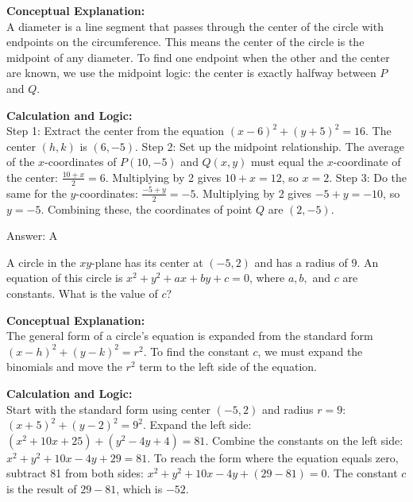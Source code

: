 \documentclass[11pt,paper=a4,answers]{exam}
\begin{document}
\begin{questions}
\begin{solution}
\textbf{Conceptual Explanation:} \\
A diameter is a line segment that passes through the center of the circle with endpoints on the circumference. This means the center of the circle is the midpoint of any diameter. To find one endpoint when the other and the center are known, we use the midpoint logic: the center is exactly halfway between $P$ and $Q$.

\vspace{30pt}

\textbf{Calculation and Logic:} \\
Step 1: Extract the center from the equation $(x - 6)^2 + (y + 5)^2 = 16$. The center $(h, k)$ is $(6, -5)$. Step 2: Set up the midpoint relationship. The average of the $x$-coordinates of $P(10, -5)$ and $Q(x, y)$ must equal the $x$-coordinate of the center: $\frac{10 + x}{2} = 6$. Multiplying by 2 gives $10 + x = 12$, so $x = 2$. Step 3: Do the same for the $y$-coordinates: $\frac{-5 + y}{2} = -5$. Multiplying by 2 gives $-5 + y = -10$, so $y = -5$. Combining these, the coordinates of point $Q$ are $(2, -5)$.

\vspace{30pt}

Answer: \colorbox{yellow!100}{A}
\end{solution}

\vspace{60pt}

\question
A circle in the $xy$-plane has its center at $(-5, 2)$ and has a radius of 9. An equation of this circle is $x^2 + y^2 + ax + by + c = 0$, where $a, b,$ and $c$ are constants. What is the value of $c$?

\begin{solution}
\textbf{Conceptual Explanation:} \\
The general form of a circle's equation is expanded from the standard form $(x - h)^2 + (y - k)^2 = r^2$. To find the constant $c$, we must expand the binomials and move the $r^2$ term to the left side of the equation.

\vspace{30pt}

\textbf{Calculation and Logic:} \\
Start with the standard form using center $(-5, 2)$ and radius $r=9$: $(x + 5)^2 + (y - 2)^2 = 9^2$. Expand the left side: $(x^2 + 10x + 25) + (y^2 - 4y + 4) = 81$. Combine the constants on the left side: $x^2 + y^2 + 10x - 4y + 29 = 81$. To reach the form where the equation equals zero, subtract 81 from both sides: $x^2 + y^2 + 10x - 4y + (29 - 81) = 0$. The constant $c$ is the result of $29 - 81$, which is $-52$.


\end{solution}
\end{questions}
\end{document}
